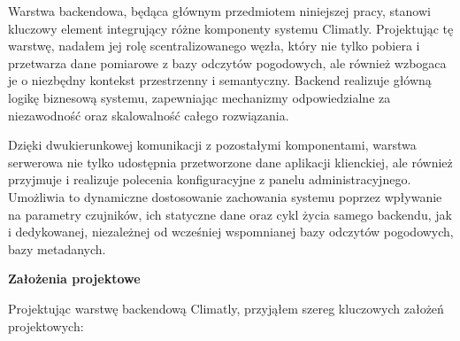\documentclass[a4paper,12pt,openany]{book}
\begin{document}
Warstwa backendowa, będąca głównym przedmiotem niniejszej pracy, stanowi kluczowy element integrujący różne komponenty systemu Climatly. Projektując tę warstwę, nadałem jej rolę scentralizowanego węzła, który nie tylko pobiera i przetwarza dane pomiarowe z bazy odczytów pogodowych, ale również wzbogaca je o niezbędny kontekst przestrzenny i semantyczny. Backend realizuje główną logikę biznesową systemu, zapewniając mechanizmy odpowiedzialne za niezawodność oraz skalowalność całego rozwiązania.

Dzięki dwukierunkowej komunikacji z pozostałymi komponentami, warstwa serwerowa nie tylko udostępnia przetworzone dane aplikacji klienckiej, ale również przyjmuje i realizuje polecenia konfiguracyjne z panelu administracyjnego. Umożliwia to dynamiczne dostosowanie zachowania systemu poprzez wpływanie na parametry czujników, ich statyczne dane oraz cykl życia samego backendu, jak i dedykowanej, niezależnej od wcześniej wspomnianej bazy odczytów pogodowych, bazy metadanych.

\vspace{1em}
\noindent\textbf{\large Założenia projektowe}
\vspace{0.5em}

Projektując warstwę backendową Climatly, przyjąłem szereg kluczowych założeń projektowych:
\end{document}
